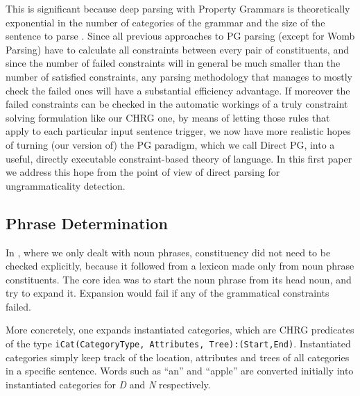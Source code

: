 \documentclass{llncs}
\newcommand{\N}{\textit{N}\xspace}
\newcommand{\D}{\textit{D}\xspace}
\begin{document}
This is significant because deep parsing with Property Grammars is theoretically exponential in the number of categories of the grammar and the size of the sentence to parse \cite{vanRullen2005}. Since all previous approaches to PG parsing (except for Womb Parsing) have to calculate all constraints between every pair of constituents, and since the number of failed constraints will in general be much smaller than the number of satisfied constraints,  any parsing methodology that manages to mostly check the failed ones will have a substantial efficiency advantage. If moreover the failed constraints can be checked in the automatic workings of a truly constraint solving formulation like our CHRG one, by means of letting those rules that apply to each particular input sentence trigger, we now have more realistic hopes of turning (our version of) the PG paradigm, which we  call Direct PG, into a useful, directly executable constraint-based theory of language. In this first paper we address this hope from the point of view of direct parsing for ungrammaticality detection.


\subsection{Phrase Determination}

In \cite {DM12}, where we only dealt with noun phrases, constituency did not need to be checked explicitly, because it followed from a lexicon made only from noun phrase constituents. The core idea was to start the noun phrase from its head noun, and try to expand it. Expansion would fail if any of the grammatical constraints failed.

More concretely, one expands instantiated categories, which are CHRG predicates of the type \texttt{iCat(CategoryType, Attributes, Tree):(Start,End)}. Instantiated categories simply keep track of the location, attributes and trees of all categories in a specific sentence. Words such as ``an'' and ``apple'' are converted initially into instantiated categories for \D and \N respectively.
\end{document}
